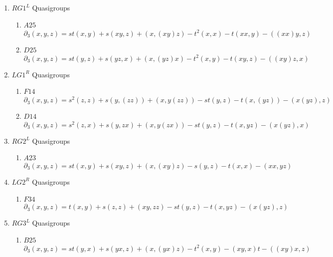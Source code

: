\documentclass[11pt]{amsart}
\theoremstyle{definition}
\begin{document}
\begin{enumerate}
    \item[(2)] $RG1^L$ Quasigroups

    \begin{enumerate}
        \item $A25$
        \[ \partial_3(x,y,z)=st(x,y) + s(xy,z) + (x,(xy)z) - t^2 (x,x)  - t (xx,y)  - ((xx)y,z) \]
        \item $D25$ 
        \[\partial_3(x,y,z)=st(y,z) + s(yz,x) + (x,(yz)x) - t^2(x,y)  - t (xy,z)  - ((xy)z,x) \]
    \end{enumerate}
    
\item[(3)] $LG1^R$ Quasigroups

    \begin{enumerate}
        \item $F14$
        \[\partial_3(x,y,z)=s^2(z, z) + s(y, (z z)) + (x, y (z z)) - st (y, z)     -
  t(x, (y z))   -(x (y z), z)  \]
        \item $D14$
        \[ \partial_3(x,y,z)=s^2 (z, x) + s(y, z x) + (x, y (z x)) - st(y, z)  -
  t (x, y z)     -(x (y z), x)    \]
    \end{enumerate}


\item[(4)] $RG2^L$ Quasigroups

    \begin{enumerate}
        \item $A23$
        \[ \partial_3(x,y,z)=st (x, y)  + s(x y, z) + (x, (x y) z)  - s(y, z)  - 
 t(x, x)  -(x x, y z) \]
    \end{enumerate}

\item[(5)] $LG2^R$ Quasigroups

    \begin{enumerate}
        \item $F34$
        \[ \partial_3(x,y,z)= t(x, y) + s(z, z) + (x y, z z)- st (y, z)  - 
 t(x, y z)   - (x (y z), z)     \]
    \end{enumerate}

\item[(6)] $RG3^L$ Quasigroups

    \begin{enumerate}
        \item $B25$
                \[ \partial_3(x,y,z)= st (y, x)+ s(y x, z)  + (x, (y x) z)-t^2 (x, y)  - 
 (x y, x) t  - ((x y) x, z)  \]
    \end{enumerate}


\end{enumerate}
\end{document}
